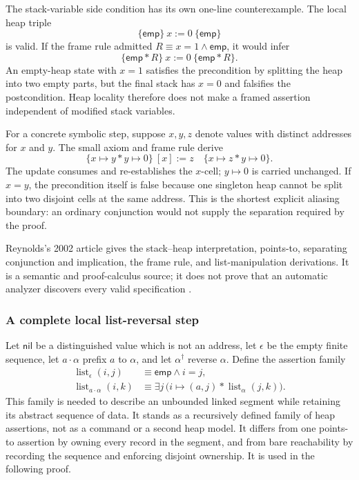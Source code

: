 The stack-variable side condition has its own one-line counterexample.  The
local heap triple
\[
 \{\mathsf{emp}\}\ x:=0\ \{\mathsf{emp}\}
\]
is valid.  If the frame rule admitted
\(R\equiv x=1\land\mathsf{emp}\), it would infer
\[
 \{\mathsf{emp}*R\}\ x:=0\ \{\mathsf{emp}*R\}.
\]
An empty-heap state with \(x=1\) satisfies the precondition by splitting the
heap into two empty parts, but the final stack has \(x=0\) and falsifies the
postcondition.  Heap locality therefore does not make a framed assertion
independent of modified stack variables.

For a concrete symbolic step, suppose \(x,y,z\) denote values with distinct
addresses for \(x\) and \(y\).  The small axiom and frame rule derive
\[
 \{x\mapsto y * y\mapsto0\}\ [x]:=z\quad
 \{x\mapsto z * y\mapsto0\}.
\]
The update consumes and re-establishes the \(x\)-cell; \(y\mapsto0\) is carried
unchanged.  If \(x=y\), the precondition itself is false because one singleton
heap cannot be split into two disjoint cells at the same address.  This is the
shortest explicit aliasing boundary: an ordinary conjunction would not supply
the separation required by the proof.

Reynolds's 2002 article gives the stack--heap interpretation, points-to,
separating conjunction and implication, the frame rule, and list-manipulation
derivations.  It is a semantic and proof-calculus source; it does not prove that
an automatic analyzer discovers every valid specification
\cite{ReynoldsSeparation2002}.

\subsubsection{A complete local list-reversal step}

Let \(\mathsf{nil}\) be a distinguished value which is not an address, let
\(\epsilon\) be the empty finite sequence, let \(a\cdot\alpha\) prefix \(a\)
to \(\alpha\), and let \(\alpha^\dagger\) reverse \(\alpha\).  Define the
assertion family
\[
\begin{aligned}
 \operatorname{list}_{\epsilon}(i,j)
   &\equiv \mathsf{emp}\land i=j,\\
 \operatorname{list}_{a\cdot\alpha}(i,k)
   &\equiv
   \exists j\,
   \bigl(i\mapsto(a,j)*
         \operatorname{list}_{\alpha}(j,k)\bigr).
\end{aligned}
\]
This family is needed to describe an unbounded linked segment while retaining
its abstract sequence of data.  It stands as a recursively defined family of
heap assertions, not as a command or a second heap model.  It differs from one
points-to assertion by owning every record in the segment, and from bare
reachability by recording the sequence and enforcing disjoint ownership.  It
is used in the following proof.

